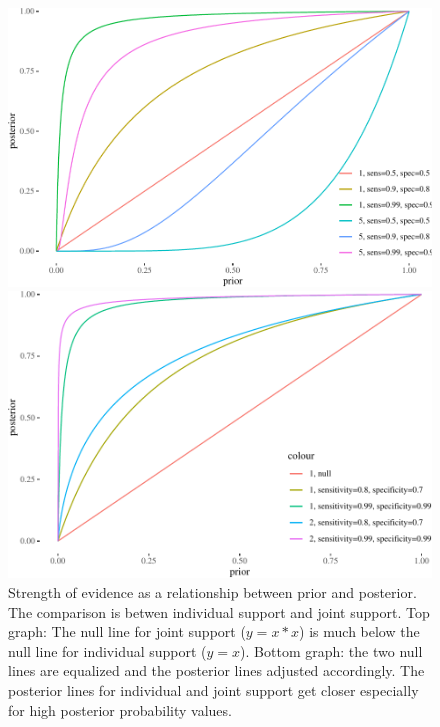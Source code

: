 \documentclass[10pt,dvipsnames,enabledeprecatedfontcommands]{scrartcl}
\begin{document}
\begin{figure}


\begin{center}\includegraphics[width=0.9\linewidth]{conjunction-paradox_files/figure-latex/unnamed-chunk-13-1} \end{center}


\begin{center}\includegraphics[width=0.9\linewidth]{conjunction-paradox_files/figure-latex/unnamed-chunk-14-1} \end{center}

\caption{Strength of evidence as a relationship between prior 
and posterior. The comparison is betwen individual support and joint support. 
Top graph: The null line for joint support ($y=x*x$) is 
much below the null line for individual support ($y=x$).
Bottom graph: the two null lines are equalized and the 
posterior lines adjusted accordingly. The posterior lines for individual 
and joint support get closer especially for 
high posterior probability values.}
\label{fig:post-indiv-joint}
\end{figure}
\end{document}
